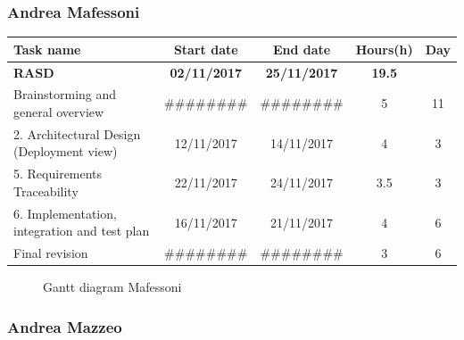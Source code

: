 
\subsubsection{Andrea Mafessoni}

\begin{table}[h!]
	\begin{tabular}{lcccc}
		\toprule
		\textbf{Task name} & \textbf{Start date} & \textbf{End date} & \textbf{Hours(h)} & \textbf{Day} \\
		\midrule
		\textbf{RASD} & \textbf{02/11/2017} & \textbf{25/11/2017} & \textbf{19.5} & \\
		Brainstorming and general overview & \#\#\#\#\#\#\#\# & \#\#\#\#\#\#\#\# & 5 & 11 \\
		2. Architectural Design (Deployment view) & 12/11/2017 & 14/11/2017 & 4 & 3 \\
		5. Requirements Traceability & 22/11/2017 & 24/11/2017 & 3.5 & 3 \\
		6. Implementation, integration and test plan & 16/11/2017 & 21/11/2017 & 4 & 6 \\
		\bottomrule
		Final revision & \#\#\#\#\#\#\#\# & \#\#\#\#\#\#\#\# & 3 & 6 \\
	\end{tabular}
\end{table}

\begin{figure}[!h]
	\centering
	\caption{Gantt diagram Mafessoni}
\end{figure}
\clearpage

\subsubsection{Andrea Mazzeo}

